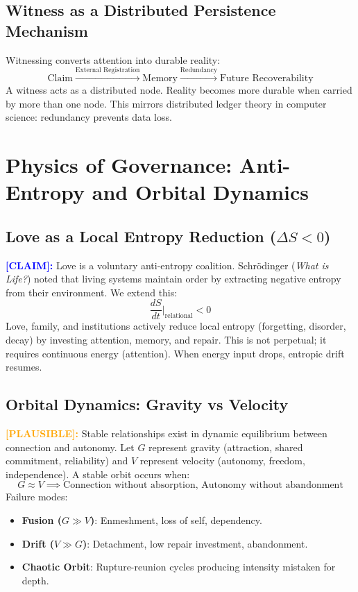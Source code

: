 \documentclass[11pt, a4paper]{article}
\newcommand{\claim}[1]{\noindent\textbf{\textcolor{blue}{[CLAIM]:}} #1}
\newcommand{\plausible}[1]{\noindent\textbf{\textcolor{orange}{[PLAUSIBLE]:}} #1}
\begin{document}
\subsection{Witness as a Distributed Persistence Mechanism}
Witnessing converts attention into durable reality:
\[
\text{Claim} \xrightarrow{\text{External Registration}} \text{Memory} \xrightarrow{\text{Redundancy}} \text{Future Recoverability}
\]
A witness acts as a distributed node. Reality becomes more durable when carried by more than one node. This mirrors distributed ledger theory in computer science: redundancy prevents data loss.

\section{Physics of Governance: Anti-Entropy and Orbital Dynamics}
\subsection{Love as a Local Entropy Reduction ($\Delta S < 0$)}
\claim{Love is a voluntary anti-entropy coalition.}
Schrödinger (\textit{What is Life?}) noted that living systems maintain order by extracting negative entropy from their environment. We extend this:
\[
\frac{dS}{dt} \bigg|_{\text{relational}} < 0
\]
Love, family, and institutions actively reduce local entropy (forgetting, disorder, decay) by investing attention, memory, and repair. This is not perpetual; it requires continuous energy (attention). When energy input drops, entropic drift resumes.

\subsection{Orbital Dynamics: Gravity vs Velocity}
\plausible{Stable relationships exist in dynamic equilibrium between connection and autonomy.}
Let $G$ represent gravity (attraction, shared commitment, reliability) and $V$ represent velocity (autonomy, freedom, independence). A stable orbit occurs when:
\[
G \approx V \implies \text{Connection without absorption, Autonomy without abandonment}
\]
Failure modes:
\begin{itemize}
    \item \textbf{Fusion ($G \gg V$)}: Enmeshment, loss of self, dependency.
    \item \textbf{Drift ($V \gg G$)}: Detachment, low repair investment, abandonment.
    \item \textbf{Chaotic Orbit}: Rupture-reunion cycles producing intensity mistaken for depth.
\end{itemize}
\end{document}
